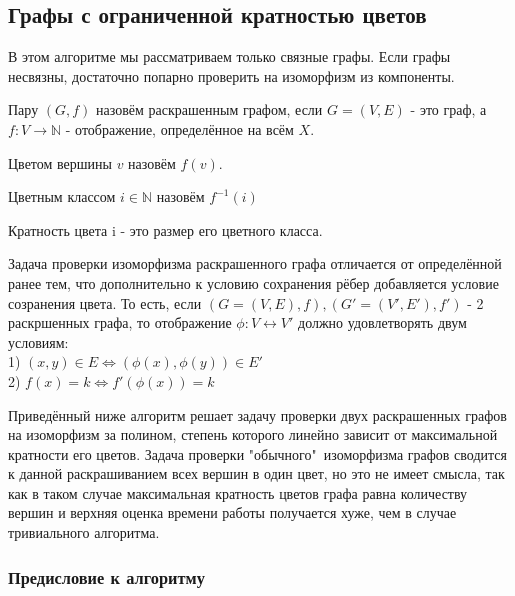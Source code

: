 \subsection{Графы с ограниченной кратностью цветов}

В этом алгоритме мы рассматриваем только связные графы. Если графы несвязны, достаточно попарно проверить на изоморфизм из компоненты.

\begin{definition}
    Пару $(G, f)$ назовём раскрашенным графом, если $G=(V, E)$ - это граф, а $f: V \rightarrow \mathbb{N}$ - отображение, определённое на всём $X$.
\end{definition}

\begin{definition}
    Цветом вершины $v$ назовём $f(v)$. 
\end{definition}

\begin{definition}
    Цветным классом $i \in \mathbb{N}$ назовём $f^{-1}(i)$ 
\end{definition}

\begin{definition}
    Кратность цвета i - это размер его цветного класса.
\end{definition}

Задача проверки изоморфизма раскрашенного графа отличается от определённой ранее тем, что дополнительно к условию сохранения рёбер добавляется условие созранения цвета. То есть, если $(G=(V, E), f), (G'=(V', E'), f')$ - 2 раскршенных графа, то отображение $\phi: V \leftrightarrow V'$ должно удовлетворять двум условиям:\\
1) $(x, y) \in E \Leftrightarrow (\phi(x), \phi(y)) \in E'$\\
2) $f(x) = k \Leftrightarrow f'(\phi(x)) = k$

Приведённый ниже алгоритм решает задачу проверки двух раскрашенных графов на изоморфизм за полином, степень которого линейно зависит от максимальной кратности его цветов.   Задача проверки "обычного"\ изоморфизма графов сводится к данной раскрашиванием всех вершин в один цвет, но это не имеет смысла, так как в таком случае максимальная кратность цветов графа равна количеству вершин и верхняя оценка времени работы получается хуже, чем в случае тривиального алгоритма.

\subsubsection*{Предисловие к алгоритму}

